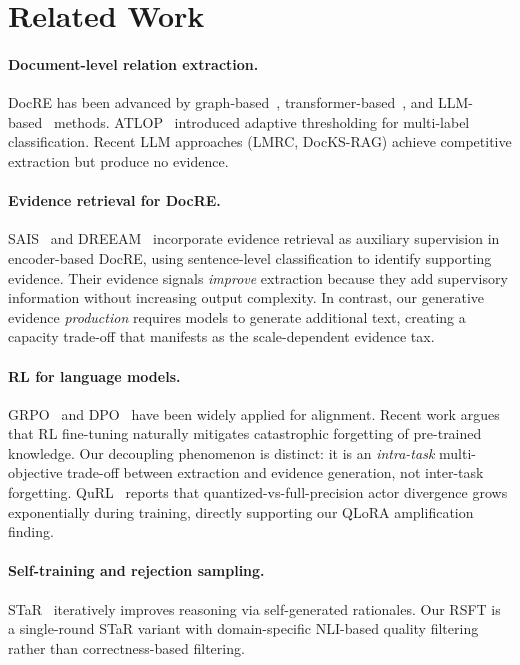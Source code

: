 \documentclass[11pt,a4paper]{article}
\begin{document}
\section{Related Work}

\paragraph{Document-level relation extraction.}
DocRE has been advanced by graph-based~\cite{zeng2020double,nan2020reasoning}, transformer-based~\cite{zhou2021atlop,tan2022document}, and LLM-based~\cite{li2023lmrc,xu2024docks} methods.
ATLOP~\cite{zhou2021atlop} introduced adaptive thresholding for multi-label classification.
Recent LLM approaches (LMRC, DocKS-RAG) achieve competitive extraction but produce no evidence.

\paragraph{Evidence retrieval for DocRE.}
SAIS~\cite{xiao2022sais} and DREEAM~\cite{tan2022dreeam} incorporate evidence retrieval as auxiliary supervision in encoder-based DocRE, using sentence-level classification to identify supporting evidence.
Their evidence signals \emph{improve} extraction because they add supervisory information without increasing output complexity.
In contrast, our generative evidence \emph{production} requires models to generate additional text, creating a capacity trade-off that manifests as the scale-dependent evidence tax.

\paragraph{RL for language models.}
GRPO~\cite{shao2024deepseekmath} and DPO~\cite{rafailov2024dpo} have been widely applied for alignment.
Recent work argues that RL fine-tuning naturally mitigates catastrophic forgetting of pre-trained knowledge.
Our decoupling phenomenon is distinct: it is an \emph{intra-task} multi-objective trade-off between extraction and evidence generation, not inter-task forgetting.
QuRL~\cite{ahmadian2024quantized} reports that quantized-vs-full-precision actor divergence grows exponentially during training, directly supporting our QLoRA amplification finding.

\paragraph{Self-training and rejection sampling.}
STaR~\cite{zelikman2022star} iteratively improves reasoning via self-generated rationales.
Our RSFT is a single-round STaR variant with domain-specific NLI-based quality filtering rather than correctness-based filtering.
\end{document}
